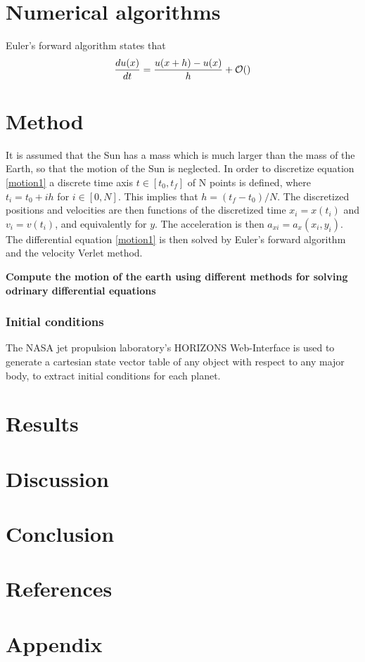 \documentclass[%
reprint,nofootinbib,
amsmath,amssymb,
aps,
]{revtex4-1}
\begin{document}
\section{Numerical algorithms}
Euler's forward algorithm states that
\begin{equation}
	\dfrac{du(x)}{dt} = \dfrac{u(x+h)-u(x)}{h} + \order{}
\end{equation}

\section{Method} \noindent 
It is assumed that the Sun has a mass which is much larger than the mass of the Earth, so that the motion of the Sun is neglected. In order to discretize equation \ref{motion1} a discrete time axis $t\in[t_0, t_{f}]$ of N points is defined, where $t_i = t_0 + ih$ for $i\in[0,N]$. This implies that $h = (t_f-t_0)/N$. The discretized positions and velocities are then functions of the discretized time $x_i = x(t_i)$ and $v_i = v(t_i)$, and equivalently for $y$. The acceleration is then $a_{xi} = a_x(x_i,y_i)$. \\
The differential equation \ref{motion1} is then solved by Euler's forward algorithm and the velocity Verlet method. 


 
\textbf{Compute the motion of the earth using different methods for solving odrinary differential equations} \\ 
\subsubsection{Initial conditions} \noindent 
The NASA jet propulsion laboratory's HORIZONS Web-Interface is used to generate a cartesian state vector table of any object with respect to any major body, to extract initial conditions for each planet. 
\section{Results} \noindent 
\section{Discussion} \noindent
\section{Conclusion} \noindent  




\onecolumngrid 
\newpage 
\section{References}
{}


\section{Appendix}
\end{document}
